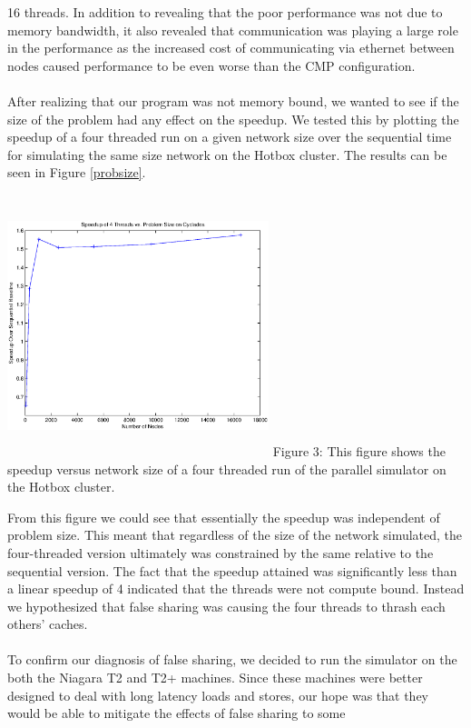 \documentclass{article}
\begin{document}
\begin{multicols}{2}
16 threads.  In addition to revealing that the poor performance was not
due to memory bandwidth, it also revealed that communication was playing a
large role in the performance as the increased cost of communicating via
ethernet between nodes caused performance to be even worse than the CMP
configuration.\\
~\\
After realizing that our program was not memory bound, we wanted to see if
the size of the problem had any effect on the speedup.  We tested this by
plotting the speedup of a four threaded run on a given network size over the
sequential time for simulating the same size network on the Hotbox
cluster.  The results can be seen in Figure \ref{probsize}.
\begin{center}
\includegraphics[height=3in,width=3in]{probsize.eps}
\small{Figure 3: This figure shows the speedup versus network size of a
four threaded run of the parallel simulator on the Hotbox cluster.}
\end{center}
From this figure we could see that essentially the speedup was independent
of problem size.  This meant that regardless of the size of the network
simulated, the four-threaded version ultimately was constrained by the
same relative to the sequential version.  The fact that the speedup
attained was significantly less than a linear speedup of 4 indicated that
the threads were not compute bound.  Instead we hypothesized that false
sharing was causing the four threads to thrash each others' caches.\\
~\\
To confirm our diagnosis of false sharing, we decided to run the simulator
on the both the Niagara T2 and T2+ machines.  Since these machines were
better designed to deal with long latency loads and stores, our hope was
that they would be able to mitigate the effects of false sharing to some

\end{multicols}
\end{document}
